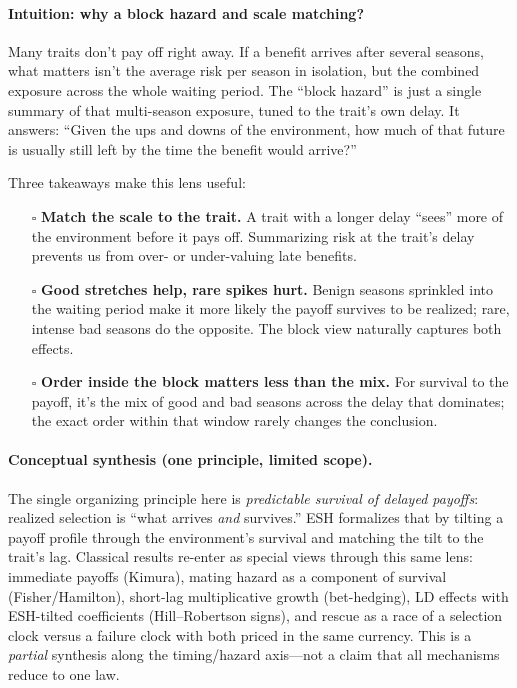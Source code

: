 \documentclass[11pt]{article}
\theoremstyle{upright}
\begin{document}
\paragraph{Intuition: why a block hazard and scale matching?}
Many traits don’t pay off right away. If a benefit arrives after several seasons, what matters isn’t the average risk per season in isolation, but the combined exposure across the whole waiting period. The “block hazard” is just a single summary of that multi-season exposure, tuned to the trait’s own delay. It answers: “Given the ups and downs of the environment, how much of that future is usually still left by the time the benefit would arrive?”

Three takeaways make this lens useful:
\begin{itemize}
\item[$\square$]  \textbf{Match the scale to the trait.} A trait with a longer delay “sees” more of the environment before it pays off. Summarizing risk at the trait’s delay prevents us from over- or under-valuing late benefits.
\item[$\square$]  \textbf{Good stretches help, rare spikes hurt.} Benign seasons sprinkled into the waiting period make it more likely the payoff survives to be realized; rare, intense bad seasons do the opposite. The block view naturally captures both effects.
\item[$\square$]  \textbf{Order inside the block matters less than the mix.} For survival to the payoff, it’s the mix of good and bad seasons across the delay that dominates; the exact order within that window rarely changes the conclusion.
\end{itemize}

\paragraph{Conceptual synthesis (one principle, limited scope).}
The single organizing principle here is \emph{predictable survival of delayed payoffs}: realized selection is “what arrives \emph{and} survives.” ESH formalizes that by tilting a payoff profile through the environment’s survival and matching the tilt to the trait’s lag. Classical results re-enter as special views through this same lens: immediate payoffs (Kimura), mating hazard as a component of survival (Fisher/Hamilton), short-lag multiplicative growth (bet-hedging), LD effects with ESH-tilted coefficients (Hill–Robertson signs), and rescue as a race of a selection clock versus a failure clock with both priced in the same currency. This is a \emph{partial} synthesis along the timing/hazard axis—not a claim that all mechanisms reduce to one law.
\end{document}
